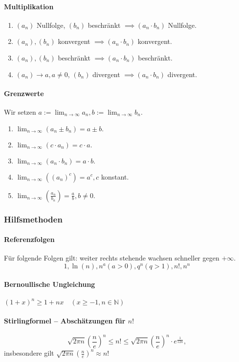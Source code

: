 \documentclass[a4paper, 9pt, DIV=24]{scrartcl}
\newcommand{\N}{\mathbb{N}}
\begin{document}
\paragraph{Multiplikation}
\begin{enumerate}[label={(}\arabic*{)}]
 \item $(a_n)$ Nullfolge, $(b_n)$ beschränkt $\implies (a_n \cdot b_n)$ Nullfolge.
 \item $(a_n), (b_n)$ konvergent $\implies (a_n \cdot b_n)$ konvergent.
 \item $(a_n), (b_n)$ beschränkt $\implies (a_n \cdot b_n)$ beschränkt.
 \item $(a_n) \to a, a \neq 0$, $(b_n)$ divergent $\implies (a_n \cdot b_n)$ divergent.
\end{enumerate}
\paragraph{Grenzwerte} Wir setzen $a := \lim_{n\to\infty} a_n, b := \lim_{n\to\infty} b_n.$
\begin{enumerate}[label={(}\arabic*{)}]
 \item $\lim_{n\to\infty}(a_n \pm b_n) = a \pm b.$
 \item $\lim_{n\to\infty}(c\cdot a_n) = c\cdot a.$
 \item $\lim_{n\to\infty}(a_n \cdot b_n) = a \cdot b.$
 \item $\lim_{n\to\infty}((a_n)^c) = a^c, c$ konstant.
 \item $\lim_{n\to\infty}(\frac{a_n}{b_n}) = \frac{a}{b}, b \neq 0.$
\end{enumerate}

\subsubsection{Hilfsmethoden}
\paragraph{Referenzfolgen}
Für folgende Folgen gilt: weiter rechts stehende wachsen schneller gegen $+\infty$.
\[1, \ln(n), n^a (a > 0), q^n (q > 1), n!, n^n\]

\paragraph{Bernoullische Ungleichung}
$(1+x)^n \geq 1 + nx \quad (x \geq -1, n \in \N)$

\paragraph{Stirlingformel -- Abschätzungen für $n!$}
\[\sqrt{2\pi n}(\frac{n}{e})^n \leq n! \leq \sqrt{2\pi n}(\frac{n}{e})^n \cdot e^{\frac{1}{12n}}, \] insbesondere gilt 
$\sqrt{2\pi n}(\frac{n}{e})^n \approx n!$
\end{document}
